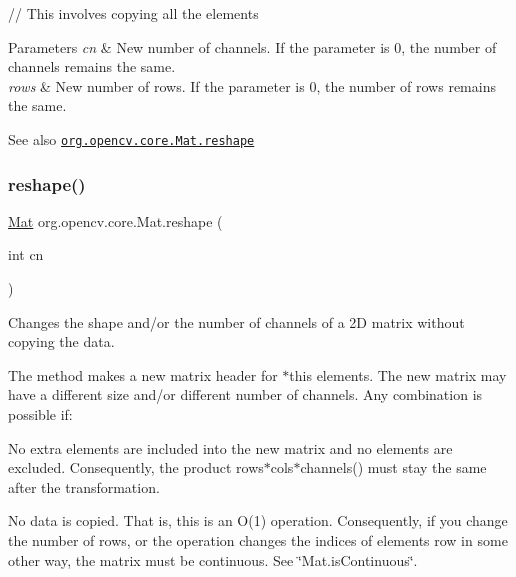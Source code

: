 {\ttfamily }

{\ttfamily }

{\ttfamily // This involves copying all the elements}

{\ttfamily }

{\ttfamily 
\begin{DoxyParams}{Parameters}
{\em cn} & New number of channels. If the parameter is 0, the number of channels remains the same. \\
\hline
{\em rows} & New number of rows. If the parameter is 0, the number of rows remains the same.\\
\hline
\end{DoxyParams}
\begin{DoxySeeAlso}{See also}
\href{http://docs.opencv.org/modules/core/doc/basic_structures.html#mat-reshape}{\tt org.\+opencv.\+core.\+Mat.\+reshape} 
\end{DoxySeeAlso}
}\mbox{\label{classorg_1_1opencv_1_1core_1_1_mat_a544b911ef4cf5e755658a1f8dd5f0b7d}} 
\subsubsection{\texorpdfstring{reshape()}{reshape()}\hspace{0.1cm}{\footnotesize\ttfamily [2/2]}}
{\footnotesize\ttfamily \mbox{\hyperlink{classorg_1_1opencv_1_1core_1_1_mat}{Mat}} org.\+opencv.\+core.\+Mat.\+reshape (\begin{DoxyParamCaption}\item[{int}]{cn }\end{DoxyParamCaption})}

Changes the shape and/or the number of channels of a 2D matrix without copying the data.

The method makes a new matrix header for {\ttfamily $\ast$this} elements. The new matrix may have a different size and/or different number of channels. Any combination is possible if\+:


\begin{DoxyItemize}
\item No extra elements are included into the new matrix and no elements are excluded. Consequently, the product {\ttfamily rows$\ast$cols$\ast$channels()} must stay the same after the transformation. 
\item No data is copied. That is, this is an O(1) operation. Consequently, if you change the number of rows, or the operation changes the indices of elements row in some other way, the matrix must be continuous. See \char`\"{}\+Mat.\+is\+Continuous\char`\"{}. 
\end{DoxyItemize}


